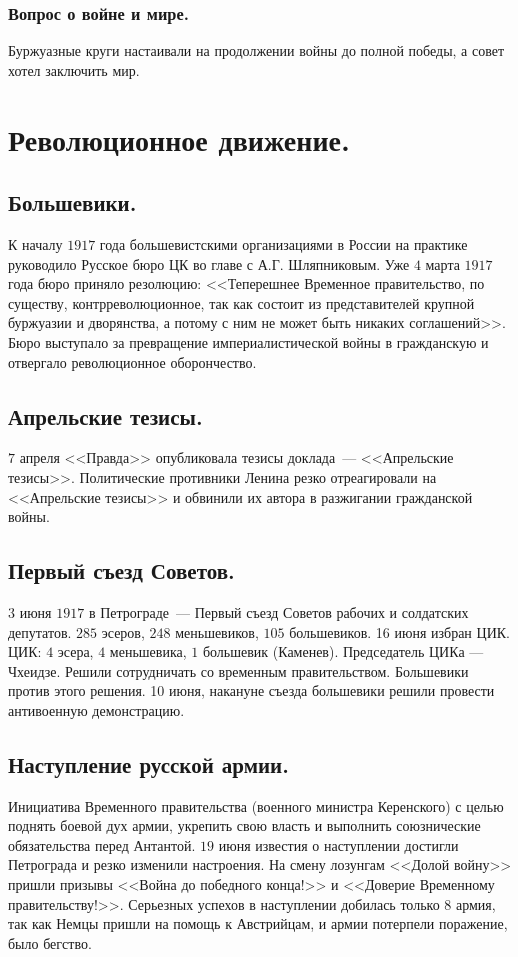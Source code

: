 \documentclass[12pt]{article}
\begin{document}
	\subsubsection{Вопрос о войне и мире.}
	Буржуазные круги настаивали на продолжении войны до полной победы, а совет хотел заключить мир.
	\section{Революционное движение.}
	\subsection{Большевики.}
	К началу $1917$ года большевистскими организациями в России на практике руководило Русское бюро ЦК во главе с А.Г. Шляпниковым. Уже $4$ марта $1917$ года бюро приняло резолюцию: <<Теперешнее Временное правительство, по существу, контрреволюционное, так как состоит из представителей крупной буржуазии и дворянства, а потому с ним не может быть никаких соглашений>>. Бюро выступало за превращение империалистической войны в гражданскую и отвергало революционное оборончество.
	\subsection{Апрельские тезисы.}
	$7$ апреля <<Правда>> опубликовала тезисы доклада~--- <<Апрельские тезисы>>. Политические противники Ленина резко отреагировали на <<Апрельские тезисы>> и обвинили их автора в разжигании гражданской войны.
	\subsection{Первый съезд Советов.}
	$3$ июня $1917$ в Петрограде~--- Первый съезд Советов рабочих и солдатских депутатов. $285$ эсеров, $248$ меньшевиков, $105$ большевиков. 16 июня избран ЦИК. ЦИК: $4$ эсера, $4$ меньшевика, $1$ большевик (Каменев). Председатель ЦИКа --- Чхеидзе. Решили сотрудничать со временным правительством. Большевики против этого решения. 10 июня, накануне съезда большевики решили провести антивоенную демонстрацию.
	\subsection{Наступление русской армии.}
	Инициатива Временного правительства (военного министра Керенского) с целью поднять боевой дух армии, укрепить свою власть и выполнить союзнические обязательства перед Антантой. $19$ июня известия о наступлении достигли Петрограда и резко изменили настроения. На смену лозунгам <<Долой войну>> пришли призывы <<Война до победного конца!>> и <<Доверие Временному правительству!>>.
	Серьезных успехов в наступлении добилась только $8$ армия, так как Немцы пришли на помощь к Австрийцам, и армии потерпели поражение, было бегство.
\end{document}
